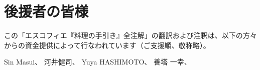 \hypertarget{benefactors}{%
\section{後援者の皆様}\label{benefactors}}

\thispagestyle{empty}

この「エスコフィエ『料理の手引き』全注解」の翻訳および注釈は、以下の方々からの資金提供によって行なわれています（ご支援順、敬称略）。

Sin Masui、\href{20180524-23h,2x,novelsoundsmail@gmail.com}{}
河井健司、\href{20180525-0h14,10x,kwibeng@gmail.com}{} Yuya
HASHIMOTO、\href{20180525-1h40,2x,hashimo0910@gmail.com}{} 善塔
一幸、\href{20180525-8h56,10x,kazuyukizento120@docomo.ne.jp}{}
